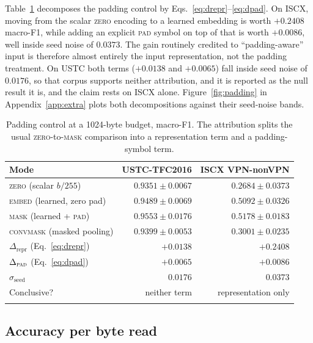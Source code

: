 \documentclass[pdflatex,sn-mathphys-num]{sn-jnl}
\theoremstyle{thmstyleone}%
\theoremstyle{thmstylethree}%
\begin{document}
Table~\ref{tab:padding} decomposes the padding control by
Eqs.~\eqref{eq:drepr}--\eqref{eq:dpad}. On ISCX, moving from the scalar
\textsc{zero} encoding to a learned embedding is worth $+0.2408$ macro-F1,
while adding an explicit \textsc{pad} symbol on top of that is worth $+0.0086$,
well inside seed noise of $0.0373$. The gain routinely credited to
``padding-aware'' input is therefore almost entirely the input representation,
not the padding treatment. On USTC both terms ($+0.0138$ and $+0.0065$) fall
inside seed noise of $0.0176$, so that corpus supports neither attribution, and it
is reported as the null result it is, and the claim rests on ISCX alone.
Figure~\ref{fig:padding} in Appendix~\ref{app:extra} plots both
decompositions against their seed-noise bands.

\begin{table}[tbp]
\caption{Padding control at a 1024-byte budget, macro-F1. The attribution
splits the usual \textsc{zero}-to-\textsc{mask} comparison into a
representation term and a padding-symbol term.}\label{tab:padding}
\begin{tabular}{@{}lrr@{}}
\toprule
Mode & USTC-TFC2016 & ISCX VPN-nonVPN \\
\midrule
\textsc{zero} (scalar $b/255$) & $0.9351 \pm 0.0067$ & $0.2684 \pm 0.0373$ \\
\textsc{embed} (learned, zero pad) & $0.9489 \pm 0.0069$ & $0.5092 \pm 0.0326$ \\
\textsc{mask} (learned + \textsc{pad}) & $0.9553 \pm 0.0176$ & $0.5178 \pm 0.0183$ \\
\textsc{convmask} (masked pooling) & $0.9399 \pm 0.0053$ & $0.3001 \pm 0.0235$ \\
\midrule
$\Delta_{\text{repr}}$ (Eq.~\ref{eq:drepr}) & $+0.0138$ & $\mathbf{+0.2408}$ \\
$\Delta_{\textsc{pad}}$ (Eq.~\ref{eq:dpad}) & $+0.0065$ & $+0.0086$ \\
$\sigma_{\text{seed}}$ & $0.0176$ & $0.0373$ \\
Conclusive? & neither term & representation only \\
\botrule
\end{tabular}
\end{table}


\subsection{Accuracy per byte read}
\end{document}
